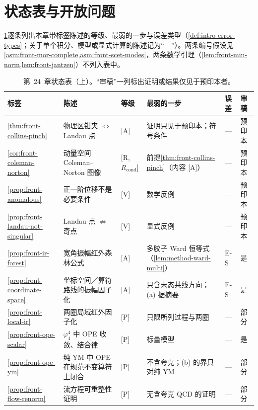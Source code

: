 \section{状态表与开放问题}\label{sec:front-status}

\cref{tab:front-status}逐条列出本章带标签陈述的等级、最弱的一步与误差类型（\cref{def:intro-error-types}；关于单个积分、模型或显式计算的陈述记为“—”）。两条编号假设见\cref{asm:front-mor-complete,asm:front-scet-modes}，两条数学引理（\cref{lem:front-min-norm,lem:front-jantzen}）不列入表中。

\begin{table}[htbp]
\centering
\caption{第~24~章状态表（上）。“审稿”一列标出证明或结果仅见于预印本者。}\label{tab:front-status}
\footnotesize
\renewcommand{\arraystretch}{1.08}
\begin{tabularx}{\textwidth}{@{}p{1.75cm}>{\raggedright\arraybackslash}Xp{1.35cm}>{\raggedright\arraybackslash}p{3.6cm}p{0.75cm}p{0.95cm}@{}}
\toprule
标签 & 陈述 & 等级 & 最弱的一步 & 误差 & 审稿 \\
\midrule
\cref{thm:front-collins-pinch} & 物理区钳夹 $\Leftrightarrow$ Landau 点 & [A] & 证明只见于预印本；符号条件 & — & 预印本 \\
\cref{cor:front-coleman-norton} & 动量空间 Coleman--Norton 图像 & [R, $R_{\mathrm{cond}}$] & 前提\cref{thm:front-collins-pinch}（内容 [A]） & — & 预印本 \\
\cref{prop:front-anomalous} & 正一阶位移不是必要条件 & [V] & 数学反例 & — & 预印本 \\
\cref{prop:front-landau-not-singular} & Landau 点 $\not\Rightarrow$ 奇点 & [V] & 显式反例 & — & 预印本 \\
\cref{prop:front-ir-forest} & 宽角振幅红外森林公式 & [A] & 多胶子 Ward 恒等式（\cref{lem:method-ward-multi}） & E-S & 是 \\
\cref{prop:front-coordinate-space} & 坐标空间／算符路线的振幅因子化 & [A] & 只含末态共线方向；(a) 据摘要 & E-S & 是 \\
\cref{prop:front-local-ir} & 两圈局域红外因子化 & [P] & 只限所列过程与两圈 & — & 部分 \\
\cref{prop:front-ope-scalar} & $\varphi^4_4$ 中 OPE 收敛、结合律 & [P] & 标量模型 & — & 是 \\
\cref{prop:front-ope-ym} & 纯 YM 中 OPE 在规范不变算符上闭合 & [P] & 不含夸克；(b) 的界只对纯 YM & — & 部分 \\
\cref{prop:front-flow-renorm} & 流方程可重整性证明 & [P] & 无含夸克 QCD 的证明 & — & 部分 \\

\end{tabularx}
\end{table}
